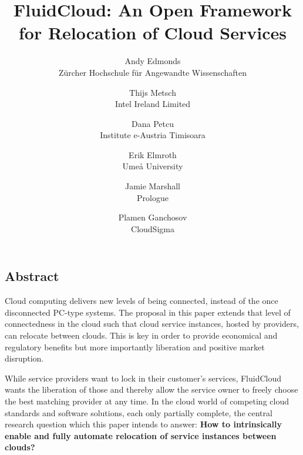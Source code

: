 \documentclass[letterpaper,twocolumn,10pt]{article}
\begin{document}
\date{}

\title{\Large \bf FluidCloud: An Open Framework for Relocation of Cloud Services}

\author{
{\rm Andy Edmonds}\\
Z\"urcher Hochschule f\"ur Angewandte Wissenschaften
\and
{\rm Thijs Metsch}\\
Intel Ireland Limited
\and
{\rm Dana Petcu}\\
Institute e-Austria Timisoara
\and
{\rm Erik Elmroth}\\
Ume{\aa} University
\and
{\rm Jamie Marshall}\\
Prologue
\and
{\rm Plamen Ganchosov}\\
CloudSigma
}

\maketitle


\subsection*{Abstract}

Cloud computing delivers new levels of being connected, instead of the once disconnected 
PC-type systems. The proposal in this paper extends that level of connectedness in the cloud such that 
cloud service instances, hosted by providers, can relocate between clouds. This is key in order to 
provide economical and regulatory benefits but more importantly liberation and positive market disruption.

While service providers want to lock in their customer's services, FluidCloud wants the liberation of those and thereby allow the service owner to freely choose the best matching provider at any time. In the cloud world of 
competing cloud standards and software solutions, each only partially complete, the central research 
question which this paper intends to answer:
\noindent
\textbf{How to intrinsically enable and fully automate relocation of service instances between clouds?}
\end{document}

